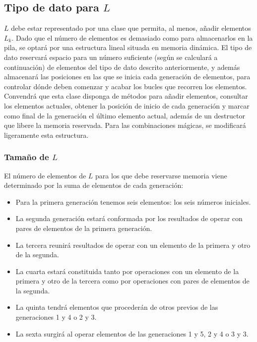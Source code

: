 \subsection{Tipo de dato para $L$}
$L$ debe estar representado por una clase que permita, al menos, añadir elementos $L_k$. Dado que el número de elementos es demasiado como para almacenarlos en la pila, se optará por una estructura lineal situada en memoria dinámica. El tipo de dato reservará espacio para un número suficiente (según se calculará a continuación) de elementos del tipo de dato descrito anteriormente, y además almacenará las posiciones en las que se inicia cada generación de elementos, para controlar dónde deben comenzar y acabar los bucles que recorren los elementos. \\

Convendrá que esta clase disponga de métodos para añadir elementos, consultar los elementos actuales, obtener la posición de inicio de cada generación y marcar como final de la generación el último elemento actual, además de un destructor que libere la memoria reservada. Para las combinaciones mágicas, se modificará ligeramente esta estructura. \\

\subsubsection{Tamaño de $L$}

El número de elementos de $L$ para los que debe reservarse memoria viene determinado por la suma de elementos de cada generación:
\begin{itemize}
	\item Para la primera generación tenemos seis elementos: los seis números iniciales.
	\item La segunda generación estará conformada por los resultados de operar con pares de elementos de la primera generación.
	\item La tercera reunirá resultados de operar con un elemento de la primera y otro de la segunda.
	\item La cuarta estará constituida tanto por operaciones con un elemento de la primera y otro de la tercera como por operaciones con pares de elementos de la segunda.
	\item La quinta tendrá elementos que procederán de otros previos de las generaciones 1 y 4 o 2 y 3.
	\item La sexta surgirá al operar elementos de las generaciones 1 y 5, 2 y 4 o 3 y 3.
\end{itemize}

